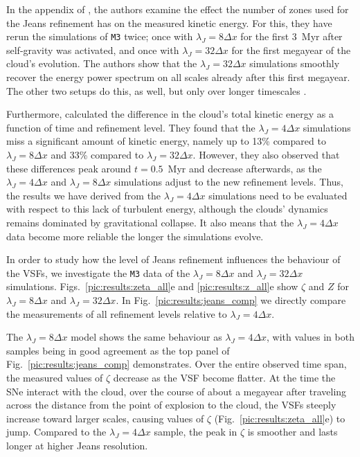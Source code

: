 In the appendix of , the authors examine the effect the number of zones used for the Jeans refinement has on the measured kinetic energy.
For this, they have rerun the simulations of \texttt{M3} twice; 
once with $\lambda_J=8\Delta{}x$ for the first 3~Myr after self-gravity was activated, and once with $\lambda_J=32\Delta{}x$ for the first megayear of the cloud's evolution.
The authors show that the $\lambda_J=32\Delta{}x$ simulations smoothly recover the energy power spectrum on all scales already after this first megayear.
The other two setups do this, as well, but only over longer timescales \citep[see also][]{IbanezMejia2017,Seifried2017b}.

Furthermore,  calculated the difference in the cloud's total kinetic energy as a function of time and refinement level.
They found that the $\lambda_J = 4\Delta{}x$ simulations miss a significant amount of kinetic energy, namely up to 13\% compared to $\lambda_J = 8\Delta{}x$ and 33\% compared to $\lambda_J = 32\Delta{}x$.
However, they also observed that these differences peak around $t=0.5$~Myr and decrease afterwards, as the $\lambda_J = 4\Delta{}x$ and $\lambda_J = 8\Delta{}x$ simulations adjust to the new refinement levels.
Thus, the results we have derived from the $\lambda_J = 4\Delta{}x$ simulations need to be evaluated with respect to this lack of turbulent energy, although the clouds' dynamics remains dominated by gravitational collapse.
It also means that the $\lambda_J = 4\Delta{}x$ data become more reliable the longer the simulations evolve.

In order to study  how the level of Jeans refinement influences the behaviour of the VSFs, we investigate the \texttt{M3} data of the $\lambda_J = 8\Delta{}x$ and $\lambda_J = 32\Delta{}x$ simulations.
Figs.~\ref{pic:results:zeta_all}e and \ref{pic:results:z_all}e show $\zeta$ and $Z$ for  $\lambda_J = 8\Delta{}x$ and $\lambda_J = 32\Delta{}x$.
In Fig.~\ref{pic:results:jeans_comp} we directly compare the measurements of all refinement levels relative to $\lambda_J = 4\Delta{}x$.

The $\lambda_J = 8\Delta{}x$ model shows the same behaviour as $\lambda_J = 4\Delta{}x$, with values in both samples being in good agreement as the top panel of Fig.~\ref{pic:results:jeans_comp} demonstrates. 
Over the entire observed time span, the measured values of $\zeta$ decrease as the VSF become flatter.
At the time the SNe interact with the cloud, over the course of about a megayear after traveling across the distance from the point of explosion to the cloud, the VSFs steeply increase toward larger scales, causing values of $\zeta$ (Fig.~\ref{pic:results:zeta_all}e) to jump.
Compared to the $\lambda_J = 4\Delta{}x$ sample, the peak in $\zeta$ is smoother and lasts longer at higher Jeans resolution.

